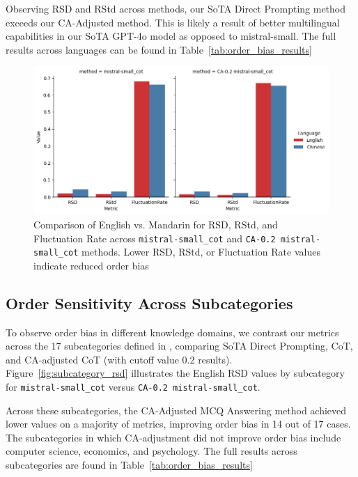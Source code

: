 Observing RSD and RStd across methods, our SoTA Direct Prompting method exceeds our CA-Adjusted method. This is likely a result of better multilingual capabilities in our SoTA GPT-4o model as opposed to mistral-small. The full results across languages can be found in Table~\ref{tab:order_bias_results}

\begin{figure}[t]
    \centering
    \includegraphics[width=\textwidth]{figures/language.png}
    \caption{Comparison of English vs. Mandarin for RSD, RStd, and Fluctuation Rate across \texttt{mistral-small\_cot} and \texttt{CA-0.2 mistral-small\_cot} methods. Lower RSD, RStd, or Fluctuation Rate values indicate reduced order bias}
    \label{fig:language_results}
\end{figure}

\subsection{Order Sensitivity Across Subcategories}

To observe order bias in different knowledge domains, we contrast our metrics across the 17 subcategories defined in \citet{hendryckstest2021}, comparing SoTA Direct Prompting, CoT, and CA-adjusted CoT (with cutoff value 0.2 results). Figure~\ref{fig:subcategory_rsd} illustrates the English RSD values by subcategory for \texttt{mistral-small\_cot} versus \texttt{CA-0.2 mistral-small\_cot}.

Across these subcategories, the CA-Adjusted MCQ Answering method achieved lower values on a majority of metrics, improving order bias in 14 out of 17 cases. The subcategories in which CA-adjustment did not improve order bias include computer science, economics, and psychology. The full results across subcategories are found in Table~\ref{tab:order_bias_results}


